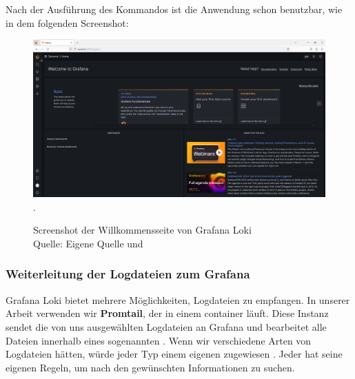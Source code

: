 \newpage
\thispagestyle{lscape}
\begin{landscape}
   Nach der Ausführung des Kommandos ist die Anwendung schon benutzbar, wie in dem folgenden Screenshot:
   \begin{center}
      \begin{figure}[H]
         \centering
         \includegraphics[width=1.3\textwidth]{assets/Installation_Grafana.png}.
         \caption{Screenshot der Willkommensseite von Grafana Loki\\Quelle: Eigene Quelle und \citep{Grafana_Logs}}
         \centering
      \end{figure}
   \end{center}
\end{landscape}

\subsubsection{Weiterleitung der Logdateien zum Grafana}
Grafana Loki bietet mehrere Möglichkeiten, Logdateien zu empfangen. In unserer Arbeit verwenden wir \textbf{Promtail}, der in einem \gls{container} läuft. Diese Instanz sendet die von uns ausgewählten Logdateien an Grafana und bearbeitet alle Dateien innerhalb eines sogenannten . Wenn wir verschiedene Arten von Logdateien hätten, würde jeder Typ einem eigenen  zugewiesen \citep{Grafana_CollectLogs}. Jeder  hat seine eigenen Regeln, um nach den gewünschten Informationen zu suchen.



